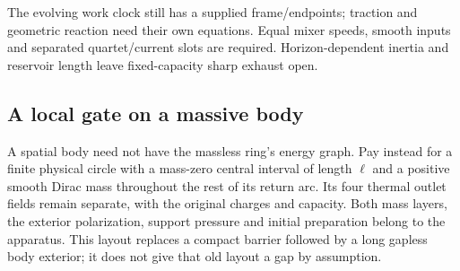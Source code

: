 The evolving work clock still has a supplied frame/endpoints;
traction and geometric reaction need their own equations. Equal mixer
speeds, smooth inputs and separated quartet/current slots are required.
Horizon-dependent inertia and reservoir length leave fixed-capacity
sharp exhaust open.

\subsection{A local gate on a massive body}
\label{sec:guarded-mass-gate}

A spatial body need not have the massless ring's energy graph.
Pay instead for a finite physical circle with a mass-zero central
interval of length $\ell$ and a positive smooth Dirac mass throughout
the rest of its return arc. Its four thermal outlet fields remain
separate, with the original charges and capacity. Both mass layers,
the exterior polarization, support pressure and initial preparation
belong to the apparatus. This layout replaces a compact barrier
followed by a long gapless body exterior; it does not give that old
layout a gap by assumption.

